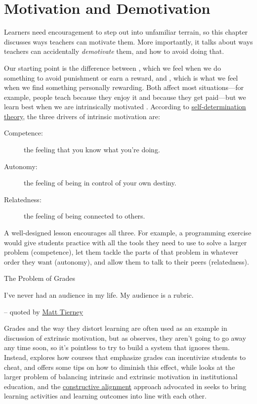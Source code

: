 \chapter{Motivation and Demotivation}\label{s:motivation}

Learners need encouragement to step out into unfamiliar terrain, so this
chapter discusses ways teachers can motivate them. More importantly, it
talks about ways teachers can accidentally \emph{demotivate} them, and how to
avoid doing that.

Our starting point is the difference between , which we feel when we do
something to avoid punishment or earn a reward, and , which is what we feel when we
find something personally rewarding. Both affect most situations---for
example, people teach because they enjoy it and because they get
paid---but we learn best when we are intrinsically motivated
\cite{Wlod2017}. According to \href{https://en.wikipedia.org/wiki/Self-determination\_theory}{self-determination
theory}, the three drivers of intrinsic
motivation are:

\begin{description}
\item[Competence:]
the feeling that you know what you're doing.
\item[Autonomy:]
the feeling of being in control of your own destiny.
\item[Relatedness:]
the feeling of being connected to others.
\end{description}

A well-designed lesson encourages all three. For example, a programming
exercise would give students practice with all the tools they need to
use to solve a larger problem (competence), let them tackle the parts of
that problem in whatever order they want (autonomy), and allow them to
talk to their peers (relatedness).

\begin{aside}{The Problem of Grades}

I've never had an audience in my life. My audience is a rubric.

-- quoted by \href{https://twitter.com/figuralities/status/987330064571387906}{Matt Tierney}

Grades and the way they distort learning are often used as an
example in discussion of extrinsic motivation, but as
\cite{Mill2016a} observes, they aren't going to go away any time
soon, so it's pointless to try to build a system that ignores
them. Instead, \cite{Lang2013} explores how courses that
emphasize grades can incentivize students to cheat, and offers some
tips on how to diminish this effect, while \cite{Covi2017} looks
at the larger problem of balancing intrinsic and extrinsic
motivation in institutional education, and the \href{https://en.wikipedia.org/wiki/Constructive\_alignment}{constructive
alignment} approach advocated in
\cite{Bigg2011} seeks to bring learning activities and learning
outcomes into line with each other.

\end{aside}


